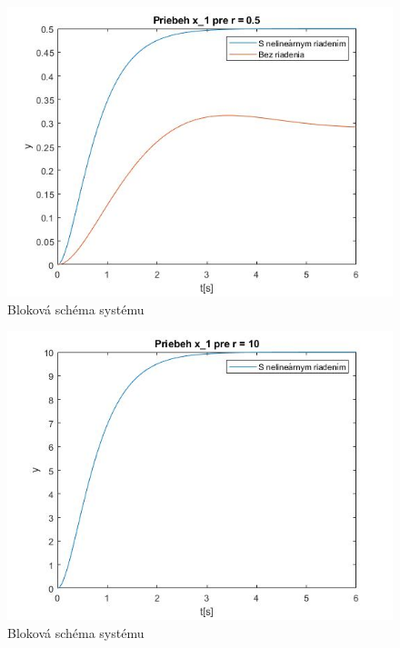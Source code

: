 \documentclass[../main.tex]{subfiles}
\begin{document}
\begin{figure}[H]
	\begin{center}\includegraphics[scale=0.6]{r05.jpg}\end{center}
	\caption{Bloková schéma systému}
	\label{fig:Vysledok1}
\end{figure}
\begin{figure}[H]
	\begin{center}\includegraphics[scale=0.6]{r10.jpg}\end{center}
	\caption{Bloková schéma systému}
	\label{fig:Vysledok2}
\end{figure}
	
\end{document}
